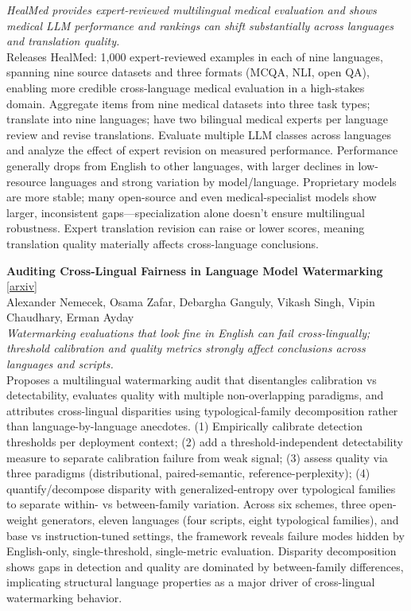 \documentclass[12pt,letterpaper]{article}
\begin{document}
{\small\textit{HealMed provides expert-reviewed multilingual medical evaluation and shows medical LLM performance and rankings can shift substantially across languages and translation quality.}}\\[1pt]
{\footnotesize Releases HealMed: 1,000 expert-reviewed examples in each of nine languages, spanning nine source datasets and three formats (MCQA, NLI, open QA), enabling more credible cross-language medical evaluation in a high-stakes domain. Aggregate items from nine medical datasets into three task types; translate into nine languages; have two bilingual medical experts per language review and revise translations. Evaluate multiple LLM classes across languages and analyze the effect of expert revision on measured performance. Performance generally drops from English to other languages, with larger declines in low-resource languages and strong variation by model/language. Proprietary models are more stable; many open-source and even medical-specialist models show larger, inconsistent gaps---specialization alone doesn't ensure multilingual robustness. Expert translation revision can raise or lower scores, meaning translation quality materially affects cross-language conclusions.}

\medskip

{\small\textbf{Auditing Cross-Lingual Fairness in Language Model Watermarking}} {\scriptsize[\href{https://arxiv.org/abs/2608.20047}{arxiv}]}\\
{\scriptsize Alexander Nemecek, Osama Zafar, Debargha Ganguly, Vikash Singh, Vipin Chaudhary, Erman Ayday}\\

{\small\textit{Watermarking evaluations that look fine in English can fail cross-lingually; threshold calibration and quality metrics strongly affect conclusions across languages and scripts.}}\\[1pt]
{\footnotesize Proposes a multilingual watermarking audit that disentangles calibration vs detectability, evaluates quality with multiple non-overlapping paradigms, and attributes cross-lingual disparities using typological-family decomposition rather than language-by-language anecdotes. (1) Empirically calibrate detection thresholds per deployment context; (2) add a threshold-independent detectability measure to separate calibration failure from weak signal; (3) assess quality via three paradigms (distributional, paired-semantic, reference-perplexity); (4) quantify/decompose disparity with generalized-entropy over typological families to separate within- vs between-family variation. Across six schemes, three open-weight generators, eleven languages (four scripts, eight typological families), and base vs instruction-tuned settings, the framework reveals failure modes hidden by English-only, single-threshold, single-metric evaluation. Disparity decomposition shows gaps in detection and quality are dominated by between-family differences, implicating structural language properties as a major driver of cross-lingual watermarking behavior.}
\end{document}
